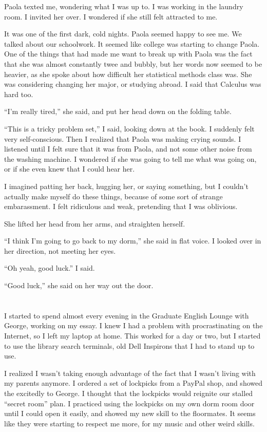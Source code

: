 Paola texted me, wondering what I was up to.  I was working in the laundry room.
I invited her over.  I wondered if she still felt attracted to me. 

It was one of the first dark, cold nights.  Paola seemed happy to see me.  We
talked about our schoolwork.  It seemed like college was starting to change
Paola.   One of the things that had made me want to break up with Paola was the
fact that she was almost constantly twee and bubbly, but her words now seemed to
be heavier, as she spoke about how difficult her statistical methods class was.
She was considering changing her major, or studying abroad.  I said that
Calculus was hard too. 

``I'm really tired,'' she said, and put her head down on the folding table.

``This is a tricky problem set,'' I said, looking down at the book.  I suddenly
felt very self-conscious.   Then I realized that Paola was making crying sounds.
I listened until I felt sure that it was from Paola, and not some other noise
from the washing machine.  I wondered if she was going to tell me what was going
on, or if she even knew that I could hear her.  

I imagined patting her back, hugging her, or saying something, but I couldn't
actually make myself do these things, because of some sort of strange
embarassment.  I felt ridiculous and weak, pretending that I was oblivious.

She lifted her head from her arms, and straighten herself.  

``I think I'm going to go back to my dorm,'' she said in flat voice.  I looked
over in her direction, not meeting her eyes.   

``Oh yeah, good luck.'' I said.

``Good luck,'' she said on her way out the door.


\section{}

I started to spend almost every evening in the Graduate English Lounge with
George, working on my essay.  I knew I had a problem with procrastinating on the
Internet, so I left my laptop at home.  This worked for a day or two, but I
started to use the library search terminals, old Dell Inspirons that I had to
stand up to use.  

I realized I wasn't taking enough advantage of the fact that I wasn't living
with my parents anymore.  I ordered a set of lockpicks from a PayPal shop, and
showed the excitedly to George.  I thought that the lockpicks would reignite our
stalled ``secret room'' plan.  I practiced using the lockpicks on my own dorm
room door until I could open it easily, and showed my new skill to the
floormates.  It seems like they were starting to respect me more, for my music
and other weird skills.

